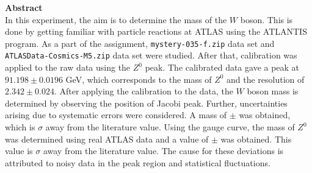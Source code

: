 \documentclass[a4paper]{report}
\numberwithin{equation}{section}
\begin{document}
\begin{titlepage}
	\vspace*{5em}

	\begin{minipage}{0.8\textwidth}
		\begin{centering}
			\textbf{Abstract}\\[0.2cm]
            In this experiment, the aim is to determine the mass of the $W$ boson. This is done by getting familiar with particle reactions at ATLAS using the ATLANTIS program. As a part of the assignment, \texttt{mystery-035-f.zip} data set and \texttt{ATLASData-Cosmics-M5.zip} data set were studied. After that, calibration was applied to the raw data using the $Z^0$ peak. The calibrated data gave a peak at $91.198 \pm 0.0196$ GeV, which corresponds to the mass of $Z^0$ and the resolution of $2.342 \pm 0.024$. After applying the calibration to the data, the $W$ boson mass is determined by observing the position of Jacobi peak. Further, uncertainties arising due to systematic errors were considered. A mass of $ \pm $ was obtained, which is $ \sigma$ away from the literature value. Using the gauge curve, the mass of $Z^0$ was determined using real ATLAS data and a value of $ \pm $ was obtained. This value is $ \sigma$ away from the literature value. The cause for these deviations is attributed to noisy data in the peak region and statistical fluctuations. 
		\end{centering}
	\end{minipage}
	
	
	
	
	
	
	 
	
	
\end{titlepage}
\end{document}
